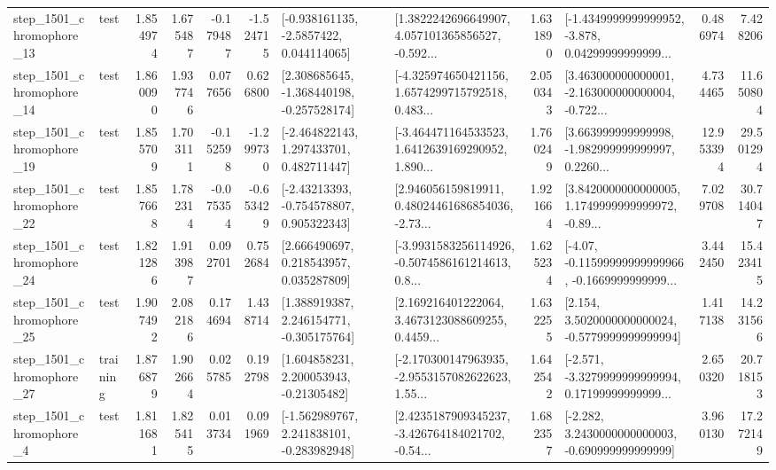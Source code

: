 \begin{tabular}{llrrrrllrlrr}
 step\_1501\_chromophore\_13 &      test &      1.854974 &    1.675487 &     -0.179487 & -1.524715 &     [-0.938161135, -2.5857422, 0.044114065] &  [1.3822242696649907, 4.057101365856527, -0.592... &       1.631890 &  [-1.4349999999999952, -3.878, 0.04299999999999... &            0.486974 &          7.428206 \\
 step\_1501\_chromophore\_14 &      test &      1.860090 &    1.937746 &      0.077656 &  0.626800 &   [2.308685645, -1.368440198, -0.257528174] &  [-4.325974650421156, 1.6574299715792518, 0.483... &       2.050343 &  [3.463000000000001, -2.163000000000004, -0.722... &            4.734465 &         11.650804 \\
 step\_1501\_chromophore\_19 &      test &      1.855709 &    1.703111 &     -0.152598 & -1.299730 &    [-2.464822143, 1.297433701, 0.482711447] &  [-3.464471164533523, 1.6412639169290952, 1.890... &       1.760249 &  [3.663999999999998, -1.982999999999997, 0.2260... &           12.953394 &         29.501294 \\
 step\_1501\_chromophore\_22 &      test &      1.857668 &    1.782314 &     -0.075354 & -0.653429 &    [-2.43213393, -0.754578807, 0.905322343] &  [2.946056159819911, 0.48024461686854036, -2.73... &       1.921664 &  [3.8420000000000005, 1.1749999999999972, -0.89... &            7.029708 &         30.714047 \\
 step\_1501\_chromophore\_24 &      test &      1.821286 &    1.913987 &      0.092701 &  0.752684 &     [2.666490697, 0.218543957, 0.035287809] &  [-3.9931583256114926, -0.5074586161214613, 0.8... &       1.625234 &  [-4.07, -0.11599999999999966, -0.1669999999999... &            3.442450 &         15.423415 \\
 step\_1501\_chromophore\_25 &      test &      1.907492 &    2.082186 &      0.174694 &  1.438714 &    [1.388919387, 2.246154771, -0.305175764] &  [2.169216401222064, 3.4673123088609255, 0.4459... &       1.632255 &   [2.154, 3.5020000000000024, -0.5779999999999994] &            1.417138 &         14.231566 \\
 step\_1501\_chromophore\_27 &  training &      1.876879 &    1.902664 &      0.025785 &  0.192798 &     [1.604858231, 2.200053943, -0.21305482] &  [-2.170300147963935, -2.9553157082622623, 1.55... &       1.642542 &  [-2.571, -3.3279999999999994, 0.17199999999999... &            2.650320 &         20.718153 \\
  step\_1501\_chromophore\_4 &      test &      1.811681 &    1.825415 &      0.013734 &  0.091969 &   [-1.562989767, 2.241838101, -0.283982948] &  [2.4235187909345237, -3.426764184021702, -0.54... &       1.682357 &   [-2.282, 3.2430000000000003, -0.690999999999999] &            3.960130 &         17.272149 \\

\end{tabular}
